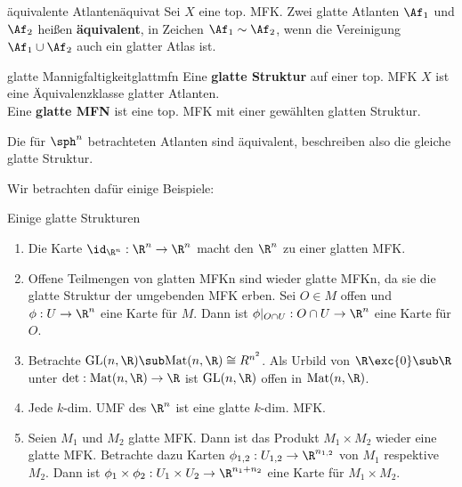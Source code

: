 \begin{definition}{äquivalente Atlanten}{äquivat}
Sei $X$ eine top. MFK. Zwei glatte Atlanten $\Af_1$ und $\Af_2$ heißen \textbf{äquivalent}, in Zeichen $\Af_1 \sim \Af_2$, wenn die Vereinigung $\Af_1 \cup \Af_2$ auch ein glatter Atlas ist.
\end{definition}
\begin{definition}{glatte Mannigfaltigkeit}{glattmfn}
Eine \textbf{glatte Struktur} auf einer top. MFK $X$ ist eine Äquivalenzklasse glatter Atlanten.\\
Eine \textbf{glatte MFN} ist eine top. MFK mit einer gewählten glatten Struktur.
\end{definition}
\begin{bemerkung}
Die für $\sph^n$ betrachteten Atlanten sind äquivalent, beschreiben also die gleiche glatte Struktur.
\end{bemerkung}
Wir betrachten dafür einige Beispiele:
\begin{beispiele} Einige glatte Strukturen
\begin{enumerate}
\item Die Karte $\id_{\R^n}: \R^n \to \R^n$ macht den $\R^n$ zu einer glatten MFK.
\item Offene Teilmengen von glatten MFKn sind wieder glatte MFKn, da sie die glatte Struktur der umgebenden MFK erben. Sei $O \in M$ offen und $\phi: U \to \R^n$ eine Karte für $M$. Dann ist $\phi |_{O \cap U}: O \cap U \to \R^n$ eine Karte für $O$.
\item Betrachte $\text{GL}(n, \R) \sub \text{Mat}(n, \R) \cong R^{n^2}$. Als Urbild von $\R \exc \{ 0 \} \sub \R$ unter $\text{det}: \text{Mat}(n, \R) \to \R$ ist $\text{GL}(n, \R)$ offen in $\text{Mat}(n, \R)$.
\item Jede $k$-dim. UMF des $\R^n$ ist eine glatte $k$-dim. MFK.
\item Seien $M_1$ und $M_2$ glatte MFK. Dann ist das Produkt $M_1 \times M_2$ wieder eine glatte MFK. Betrachte dazu Karten $\phi_{1,2}: U_{1,2} \to \R^{n_{1,2}}$ von $M_1$ respektive $M_2$. Dann ist $\phi_1 \times \phi_2: U_1 \times U_2 \to \R^{n_1 + n_2}$ eine Karte für $M_1 \times M_2$.
\end{enumerate}
\end{beispiele}
